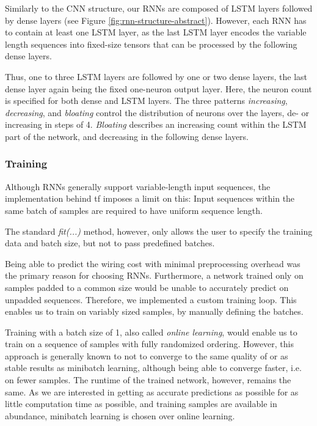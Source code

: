 Similarly to the \gls{CNN} structure, our \glspl{RNN} are composed of \gls{LSTM} layers followed by dense layers (see Figure \ref{fig:rnn-structure-abstract}). However, each \gls{RNN} has to contain at least one \gls{LSTM} layer, as the last \gls{LSTM} layer encodes the variable length sequences into fixed-size tensors that can be processed by the following dense layers.

Thus, one to three \gls{LSTM} layers are followed by one or two dense layers, the last dense layer again being the fixed one-neuron output layer. Here, the neuron count is specified for both dense and \gls{LSTM} layers. The three patterns \textit{increasing}, \textit{decreasing}, and \textit{bloating} control the distribution of neurons over the layers, de- or increasing in steps of 4. \textit{Bloating} describes an increasing count within the \gls{LSTM} part of the network, and decreasing in the following dense layers.

\subsubsection{Training}

Although \glspl{RNN} generally support variable-length input sequences, the implementation behind \gls{tf} imposes a limit on this: Input sequences within the same batch of samples are required to have uniform sequence length.

The standard \textit{fit(...)} method, however, only allows the user to specify the training data and batch size, but not to pass predefined batches.

Being able to predict the wiring cost with minimal preprocessing overhead was the primary reason for choosing \glspl{RNN}. Furthermore, a network trained only on samples padded to a common size would be unable to accurately predict on unpadded sequences. Therefore, we implemented a custom training loop. This enables us to train on variably sized samples, by manually defining the batches.

Training with a batch size of 1, also called \textit{online learning}, would enable us to train on a sequence of samples with fully randomized ordering. However, this approach is generally known to not to converge to the same quality of or as stable results as minibatch learning, although being able to converge faster, i.e. on fewer samples. The runtime of the trained network, however, remains the same. As we are interested in getting as accurate predictions as possible for as little computation time as possible, and training samples are available in abundance, minibatch learning is chosen over online learning.


